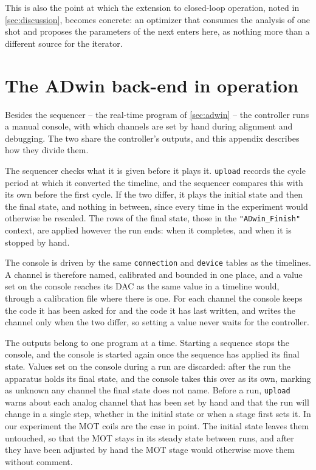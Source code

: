\documentclass{SciPost}
\newcommand{\alert}[1]{{\color{red}\textbf{#1}}}
\newcommand{\python}[1]{%
  \texttt{#1}%
}
\begin{document}
\begin{appendix}
This is also the point at which the extension to closed-loop operation, noted in \cref{sec:discussion}, becomes concrete: an optimizer that consumes the analysis of one shot and proposes the parameters of the next enters here, as nothing more than a different source for the iterator.


\section{The ADwin back-end in operation}
\label{sec:adwin_operation}
Besides the sequencer – the real-time program of \cref{sec:adwin} – the controller runs a manual console, with which channels are set by hand during alignment and debugging. The two share the controller’s outputs, and this appendix describes how they divide them.

The sequencer checks what it is given before it plays it. \python{upload} records the cycle period at which it converted the timeline, and the sequencer compares this with its own before the first cycle. If the two differ, it plays the initial state and then the final state, and nothing in between, since every time in the experiment would otherwise be rescaled. The rows of the final state, those in the \python{"ADwin_Finish"} context, are applied however the run ends: when it completes, and when it is stopped by hand.

The console is driven by the same \python{connection} and \python{device} tables as the timelines. A channel is therefore named, calibrated and bounded in one place, and a value set on the console reaches its DAC as the same value in a timeline would, through a calibration file where there is one. For each channel the console keeps the code it has been asked for and the code it has last written, and writes the channel only when the two differ, so setting a value never waits for the controller.

The outputs belong to one program at a time. Starting a sequence stops the console, and the console is started again once the sequence has applied its final state. Values set on the console during a run are discarded: after the run the apparatus holds its final state, and the console takes this over as its own, marking as unknown any channel the final state does not name. Before a run, \python{upload} warns about each analog channel that has been set by hand and that the run will change in a single step, whether in the initial state or when a stage first sets it. In our experiment the MOT coils are the case in point. The initial state leaves them untouched, so that the MOT stays in its steady state between runs, and after they have been adjusted by hand the MOT stage would otherwise move them without comment.

\end{appendix}
 
\end{document}
